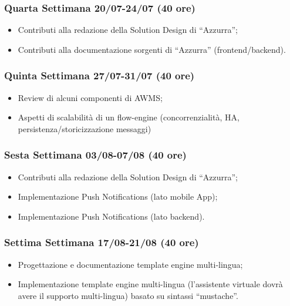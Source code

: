 \begin{trivlist}
\item \subsubsection{Quarta Settimana 20/07-24/07  (40 ore)}
\begin{itemize}
	\item Contributi alla redazione della Solution Design di “Azzurra”;
	\item Contributi alla documentazione sorgenti di “Azzurra” (frontend/backend).
\end{itemize}

\item \subsubsection{Quinta Settimana 27/07-31/07 (40 ore)}
\begin{itemize}
	\item Review di alcuni componenti di \gls{AWMS};
	\item Aspetti di scalabilità di un flow-engine (concorrenzialità, HA, persistenza/storicizzazione
	messaggi)
\end{itemize}

\item \subsubsection{Sesta Settimana 03/08-07/08 (40 ore)}
\begin{itemize}
	\item Contributi alla redazione della Solution Design di “Azzurra”;
	\item Implementazione Push Notifications (lato mobile App);
	\item Implementazione Push Notifications (lato backend).
\end{itemize}

\item \subsubsection{Settima Settimana 17/08-21/08 (40 ore)}
\begin{itemize}
	\item Progettazione e documentazione template engine multi-lingua;
	\item Implementazione template engine multi-lingua (l’assistente virtuale dovrà avere il supporto multi-lingua) basato su sintassi “mustache”.
\end{itemize}	


\end{trivlist}
